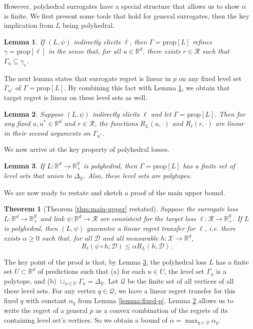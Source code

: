 \documentclass{article}
\newtheorem{theorem}{Theorem}
\newtheorem{lemma}{Lemma}
\theoremstyle{definition}\newtheorem{definition}{Definition}
\theoremstyle{definition}\newtheorem{assumption}{Assumption}
\newcommand{\reals}{\mathbb{R}}
\newcommand{\prop}[1]{\mathrm{prop}[#1]}
\newcommand{\simplex}{\Delta_\Y}
\newcommand{\D}{\mathcal{D}}
\newcommand{\R}{\mathcal{R}}
\newcommand{\X}{\mathcal{X}}
\newcommand{\Y}{\mathcal{Y}}
\begin{document}
However, polyhedral surrogates have a special structure that allows us to show $\alpha$ is finite.
We first present some tools that hold for general surrogates, then the key implication from $L$ being polyhedral.

\begin{lemma} \label{lemma:refines}
  If $(L,\psi)$ indirectly elicits $\ell$, then $\Gamma = \prop{L}$ \emph{refines} $\gamma = \prop{\ell}$ in the sense that, for all $u \in \reals^d$, there exists $r \in \R$ such that $\Gamma_u \subseteq \gamma_r$.
\end{lemma}

The next lemma states that surrogate regret is linear in $p$ on any fixed level set $\Gamma_{u^*}$ of $\Gamma = \prop{L}$.
By combining this fact with Lemma \ref{lemma:refines}, we obtain that target regret is linear on these level sets as well.
\begin{lemma} \label{lemma:linear-on-levelset}
  Suppose $(L,\psi)$ indirectly elicits $\ell$ and let $\Gamma = \prop{L}$.
  Then for any fixed $u,u^* \in \reals^d$ and $r \in \R$, the functions $R_L(u,\cdot)$ and $R_{\ell}(r,\cdot)$ are linear in their second arguments on $\Gamma_{u^*}$.
\end{lemma}

We now arrive at the key property of polyhedral losses.
\begin{lemma} \label{lemma:polyhedral-finite}
  If $L: \reals^d \to \reals_+^{\Y}$ is polyhedral, then $\Gamma = \prop{L}$ has a finite set of level sets that union to $\simplex$. Also, these level sets are polytopes.
\end{lemma}

We are now ready to restate and sketch a proof of the main upper bound.
\begin{theorem}[Theorem \ref{thm:main-upper} restated] \label{thm:main-upper-details}
  Suppose the surrogate loss $L: \reals^d \to \reals_+^{\Y}$ and link $\psi: \reals^d \to \R$ are consistent for the target loss $\ell: \R \to \reals_+^{\Y}$.
  If $L$ is polyhedral, then $(L,\psi)$ guarantee a linear regret transfer for $\ell$, i.e. there exists $\alpha \geq 0$ such that, for all $\D$ and all measurable $h: \X \to \reals^d$,
    \[ R_{\ell}(\psi \circ h ; \D) \leq \alpha R_L(h ; \D) . \]
\end{theorem}
The key point of the proof is that, by Lemma \ref{lemma:polyhedral-finite}, the polyhedral loss $L$ has a finite set $U \subset \reals^d$ of predictions such that (a) for each $u \in U$, the level set $\Gamma_u$ is a polytope, and (b) $\cup_{u \in U} \Gamma_u = \simplex$.
Let $\mathcal{Q}$ be the finite set of all vertices of all these level sets.
For any vertex $q \in \mathcal{Q}$, we have a linear regret transfer for this fixed $q$ with constant $\alpha_q$ from Lemma \ref{lemma:fixed-p}.
Lemma \ref{lemma:linear-on-levelset} allows us to write the regret of a general $p$ as a convex combination of the regrets of its containing level set's vertices.
So we obtain a bound of $\alpha = \max_{q \in \mathcal{Q}} \alpha_q$.
\end{document}
